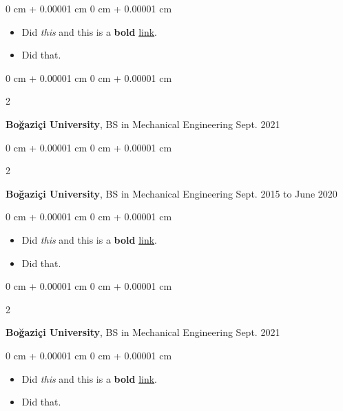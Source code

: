 \documentclass[10pt, letterpaper]{article}
\newenvironment{highlights}{
    \begin{itemize}[
        topsep=0.10 cm,
        parsep=0.10 cm,
        partopsep=0pt,
        itemsep=0pt,
        leftmargin=0 cm + 10pt
    ]
}{
    \end{itemize}
        
    \vspace{-0.10cm}
} %
\newenvironment{onecolentry}{
    \begin{adjustwidth}{
        0 cm + 0.00001 cm
    }{
        0 cm + 0.00001 cm
    }
}{
    \end{adjustwidth}
} %
\newenvironment{twocolentry}[2][]{
    \onecolentry
    \def\secondColumn{#2}
    \setcolumnwidth{\fill, 4.1 cm}
    \begin{paracol}{2}
}{
    \switchcolumn \raggedleft \secondColumn
    \end{paracol}
    \endonecolentry
} %
\begin{document}
        \vspace{0.10 cm}
        \begin{onecolentry}
            \begin{highlights}
                \item Did \textit{this} and this is a \textbf{bold} \href{https://example.com}{link}.
                \item Did that.
            \end{highlights}
        \end{onecolentry}


        \vspace{0.15 cm}

        \begin{twocolentry}{
            Sept. 2021
        }
            \textbf{Boğaziçi University}, BS in Mechanical Engineering\end{twocolentry}

        \vspace{0.10 cm}


        \vspace{0.15 cm}

        \begin{twocolentry}{
            Sept. 2015 to June 2020
        }
            \textbf{Boğaziçi University}, BS in Mechanical Engineering\end{twocolentry}

        \vspace{0.10 cm}
        \begin{onecolentry}
            \begin{highlights}
                \item Did \textit{this} and this is a \textbf{bold} \href{https://example.com}{link}.
                \item Did that.
            \end{highlights}
        \end{onecolentry}


        \vspace{0.15 cm}

        \begin{twocolentry}{
            Sept. 2021
        }
            \textbf{Boğaziçi University}, BS in Mechanical Engineering\end{twocolentry}

        \vspace{0.10 cm}
        \begin{onecolentry}
            \begin{highlights}
                \item Did \textit{this} and this is a \textbf{bold} \href{https://example.com}{link}.
                \item Did that.
            \end{highlights}
        \end{onecolentry}
\end{document}
